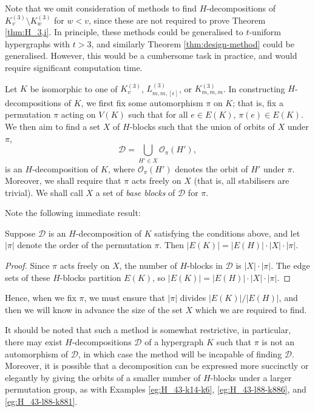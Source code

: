 Note that we omit consideration of methods to find $H$-decompositions of $K_{v}^{(3)} \setminus K_{w}^{(3)}$ for $w < v$, since these are not required to prove Theorem \ref{thm:H_3,i}.
In principle, these methods could be generalised to $t$-uniform hypergraphs with $t > 3$, and similarly Theorem \ref{thm:design-method} could be generalised. However, this would be a cumbersome task in practice, and would require significant computation time.

Let $K$ be isomorphic to one of $K_{v}^{(3)}$, $L_{m,m,[\epsilon]}^{(3)}$, or $K_{m,m,m}^{(3)}$.
In constructing $H$-decompositions of $K$, we first fix some automorphism $\pi$ on $K$; that is, fix a permutation $\pi$ acting on $V(K)$ such that for all $e \in E(K)$, $\pi(e) \in E(K)$. We then aim to find a set $X$ of $H$-blocks such that the union of orbits of $X$ under $\pi$,
\begin{equation} \label{eq:decomposition-orbit}
    \mathcal{D} = \bigcup_{H' \in X} \mathcal{O}_\pi(H'),
\end{equation}
is an $H$-decomposition of $K$, where $\mathcal{O}_\pi(H')$ denotes the orbit of $H'$ under $\pi$. Moreover, we shall require that $\pi$ acts freely on $X$ (that is, all stabilisers are trivial).
We shall call $X$ a set of {\em base blocks} of $\mathcal{D}$ for $\mathcal{\pi}$.

Note the following immediate result:

\begin{lemma} \label{lem:orbit-divisibility}
Suppose $\mathcal{D}$ is an $H$-decomposition of $K$ satisfying the conditions above, and let $|\pi|$ denote the order of the permutation $\pi$.
Then $|E(K)| = |E(H)| \cdot |X| \cdot |\pi|$.
\end{lemma}

\begin{proof}
Since $\pi$ acts freely on $X$, the number of $H$-blocks in $\mathcal{D}$ is $|X| \cdot |\pi|$. The edge sets of these $H$-blocks partition $E(K)$, so $|E(K)| = |E(H)| \cdot |X| \cdot |\pi|$.
\end{proof}

Hence, when we fix $\pi$, we must ensure that $|\pi|$ divides $|E(K)|/|E(H)|$, and then we will know in advance the size of the set $X$ which we are required to find.

It should be noted that such a method is somewhat restrictive, in particular, there may exist $H$-decompositions $\mathcal{D}$ of a hypergraph $K$ such that $\pi$ is not an automorphism of $\mathcal{D}$, in which case the method will be incapable of finding $\mathcal{D}$.
Moreover, it is possible that a decomposition can be expressed more succinctly or elegantly by giving the orbits of a smaller number of $H$-blocks under a larger permutation group, as with Examples \ref{eg:H_43-k14-k6}, \ref{eg:H_43-l88-k886}, and \ref{eg:H_43-l88-k881}.
